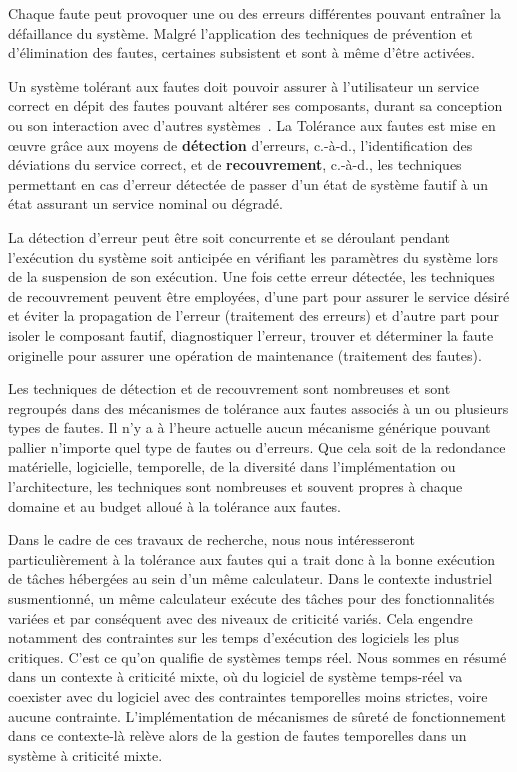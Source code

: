 \documentclass[french, a4paper, 11pt, twoside, pdftex]{StyleThese}
\begin{document}
		Chaque faute peut provoquer une ou des erreurs différentes pouvant entraîner la défaillance du système. Malgré l’application des techniques de prévention et d’élimination des fautes, certaines subsistent et sont à même d’être activées.
		
		Un système tolérant aux fautes doit pouvoir assurer à l’utilisateur un service correct en dépit des fautes pouvant altérer ses composants, durant sa conception ou son interaction avec d’autres systèmes~\cite{avizienis_basic_2004}. La Tolérance aux fautes est mise en œuvre grâce aux moyens de \textbf{détection} d’erreurs, c.-à-d., l’identification des déviations du service correct, et de \textbf{recouvrement}, c.-à-d., les techniques permettant en cas d’erreur détectée de passer d’un état de système fautif à un état assurant un service nominal ou dégradé.
		
		La détection d’erreur peut être soit concurrente et se déroulant pendant l’exécution du système soit anticipée en vérifiant les paramètres du système lors de la suspension de son exécution. Une fois cette erreur détectée, les techniques de recouvrement peuvent être employées, d’une part pour assurer le service désiré et éviter la propagation de l’erreur (traitement des erreurs) et d’autre part pour isoler le composant fautif, diagnostiquer l’erreur, trouver et déterminer la faute originelle pour assurer une opération de maintenance (traitement des fautes).
		
		Les techniques de détection et de recouvrement sont nombreuses et sont regroupés dans des mécanismes de tolérance aux fautes associés à un ou plusieurs types de fautes. Il n’y a à l’heure actuelle aucun mécanisme générique pouvant pallier n’importe quel type de fautes ou d’erreurs. Que cela soit de la redondance matérielle, logicielle, temporelle, de la diversité dans l’implémentation ou l’architecture, les techniques sont nombreuses et souvent propres à chaque domaine et au budget alloué à la tolérance aux fautes.
		
		Dans le cadre de ces travaux de recherche, nous nous intéresseront particulièrement à la tolérance aux fautes qui a trait donc à la bonne exécution de tâches hébergées au sein d'un même calculateur. Dans le contexte industriel susmentionné, un même calculateur exécute des tâches pour des fonctionnalités variées et par conséquent avec des niveaux de criticité variés. Cela engendre notamment des contraintes sur les temps d'exécution des logiciels les plus critiques. C'est ce qu'on qualifie de systèmes temps réel. Nous sommes en résumé dans un contexte à criticité mixte, où du logiciel de système temps-réel va coexister avec du logiciel avec des contraintes temporelles moins strictes, voire aucune contrainte. L'implémentation de mécanismes de sûreté de fonctionnement dans ce contexte-là relève alors de la gestion de fautes temporelles dans un système à criticité mixte. 
		
\end{document}
